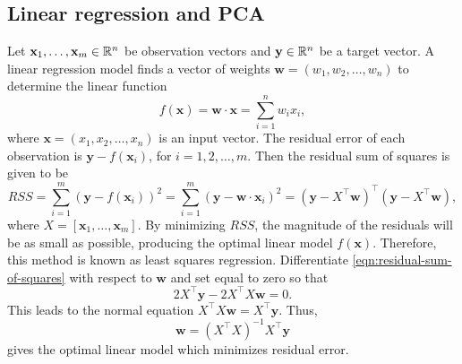 \subsection{Linear regression and PCA}
\def\vb#1{\mathbf{#1}}
\cite{shawe2004kernel}
Let \(\vb{x}_1, \dots, \vb{x}_m \in \RR^n\) be observation vectors and \(\vb{y} \in \RR^n\) be a target vector.
A linear regression model finds a vector of weights \(\vb{w} = (w_1, w_2, \dots, w_n)\) to determine the linear function
\begin{equation}
    f(\vb{x}) = \vb{w} \cdot \vb{x} = \sum_{i=1}^{n} w_i x_i,
\end{equation}
where \(\vb{x} = (x_1, x_2, \dots, x_n)\) is an input vector.
The residual error of each observation is \(\vb{y} - f(\vb{x}_i)\), for \(i = 1,2, \dots, m\).
Then the residual sum of squares is given to be
\begin{equation}
    \label{eqn:residual-sum-of-squares}
    RSS
    = \sum_{i=1}^{m} (\vb{y} - f(\vb{x}_i))^2
    = \sum_{i=1}^{m} (\vb{y} - \vb{w} \cdot \vb{x}_i)^2
    = (\vb{y} - X^\top \vb{w})^\top (\vb{y} - X^\top \vb{w}),
\end{equation}
where \(X = [\vb{x}_1, \dots, \vb{x}_m]\).
By minimizing \(RSS\), the magnitude of the residuals will be as small as possible, producing the optimal linear model \(f(\vb{x})\).
Therefore, this method is known as least squares regression.
Differentiate \eqref{eqn:residual-sum-of-squares} with respect to \(\vb{w}\) and set equal to zero so that
\begin{equation}
    2 X^\top \vb{y} - 2 X^\top X \vb{w} = 0.
\end{equation}
This leads to the normal equation \(X^\top X \vb{w} = X^\top \vb{y}\).
Thus,
\begin{equation}
    \vb{w} = (X^\top X)^{-1} X^\top \vb{y}
\end{equation}
gives the optimal linear model which minimizes residual error.

